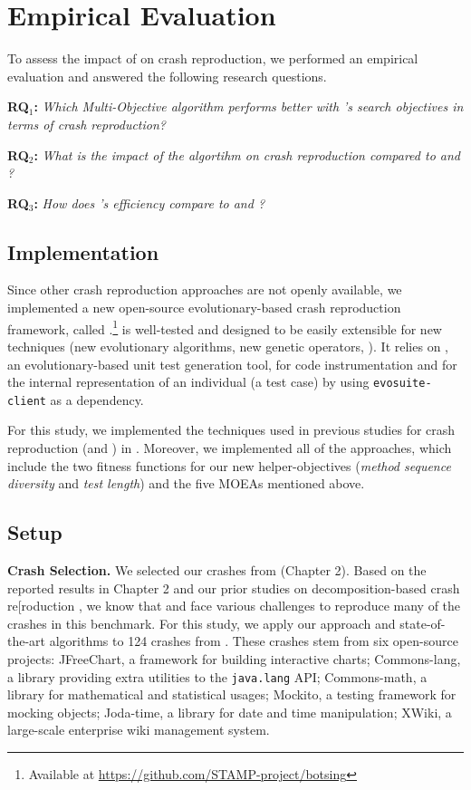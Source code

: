 

\section{Empirical Evaluation}
\label{sec:setup}
To assess the impact of \moho on crash reproduction, we performed an empirical evaluation and answered the following research questions.

\textbf{RQ$_1$: } \textit{Which Multi-Objective algorithm performs better with \moho's search objectives in terms of crash reproduction?}

\textbf{RQ$_2$: } \textit{What is the impact of the \moho algortihm on crash reproduction compared to \SGGA and \decomposition?}

\textbf{RQ$_3$: } \textit{How does \moho's efficiency compare to \SGGA and \decomposition?}



\subsection{Implementation}
\label{sec:approach:implementation}
Since other crash reproduction approaches are not openly available, we implemented a new open-source evolutionary-based crash reproduction framework, called \botsing.\footnote{Available at \url{https://github.com/STAMP-project/botsing}}
\botsing is well-tested and designed to be easily extensible for new techniques (new evolutionary algorithms, new genetic operators, \etc). It relies on \evosuite \cite{Fraser2011}, an evolutionary-based unit test generation tool, for code instrumentation and for the internal representation of an individual (\ie a test case) by using \texttt{e\-vo\-suite-cli\-ent} as a dependency.

For this study, we implemented the techniques used in previous studies for crash reproduction (\SGGA and \decomposition) in \botsing. Moreover, we implemented all of the \moho approaches, which include the two fitness functions for our new helper-objectives (\textit{method sequence diversity} and \textit{test length}) and the five MOEAs mentioned above.

\subsection{Setup}
\label{sec:approach:setup}
\textbf{Crash Selection. }
We selected our crashes from \crashpack (Chapter 2). 
Based on the reported results in Chapter 2 and our prior studies on decomposition-based crash re[roduction \cite{Soltani2018b}, we know that \SGGA and \decomposition face various challenges to reproduce many of the crashes in this benchmark. For this study, we apply our approach and state-of-the-art algorithms to 124 crashes from \crashpack. These crashes stem from six open-source projects: \textrm{JFreeChart}, a framework for building interactive charts; \textrm{Commons-lang}, a library providing extra utilities to the \texttt{java.lang} API; \textrm{Commons-math}, a library for mathematical and statistical usages; \textrm{Mockito}, a testing framework for mocking objects;
\textrm{Joda-time}, a library for date and time manipulation; XWiki, a large-scale enterprise wiki management system.


